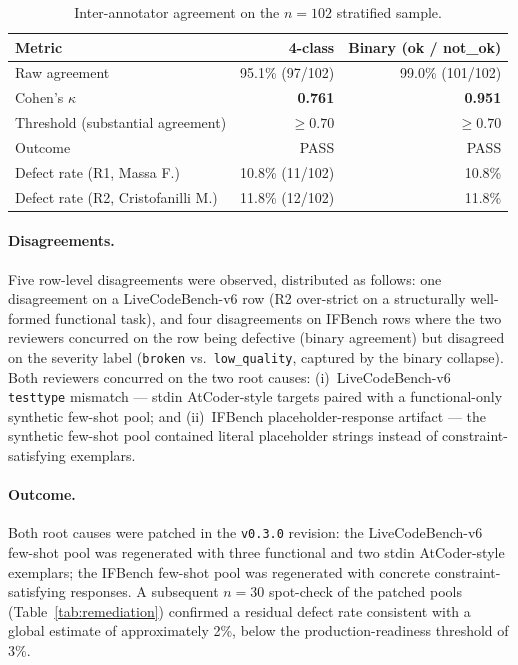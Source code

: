 \documentclass[11pt,a4paper]{article}
\begin{document}
\begin{table}[ht]
\centering
\caption{Inter-annotator agreement on the $n=102$ stratified sample.}
\label{tab:kappa}
\small
\begin{tabular}{l r r}
\toprule
\textbf{Metric} & \textbf{4-class} & \textbf{Binary (ok / not\_ok)} \\
\midrule
Raw agreement      & 95.1\% (97/102) & 99.0\% (101/102) \\
Cohen's $\kappa$~\cite{cohen1960kappa}   & \textbf{0.761}  & \textbf{0.951} \\
Threshold (substantial agreement) & $\ge 0.70$ & $\ge 0.70$ \\
Outcome            & PASS            & PASS \\
\midrule
Defect rate (R1, Massa F.)        & 10.8\% (11/102) & 10.8\% \\
Defect rate (R2, Cristofanilli M.)& 11.8\% (12/102) & 11.8\% \\
\bottomrule
\end{tabular}
\end{table}

\paragraph{Disagreements.} Five row-level disagreements were observed, distributed as follows: one disagreement on a LiveCodeBench-v6 row (R2 over-strict on a structurally well-formed functional task), and four disagreements on IFBench rows where the two reviewers concurred on the row being defective (binary agreement) but disagreed on the severity label (\texttt{broken} vs.\ \texttt{low\_quality}, captured by the binary collapse). Both reviewers concurred on the two root causes: (i)~LiveCodeBench-v6 \texttt{testtype} mismatch — stdin AtCoder-style targets paired with a functional-only synthetic few-shot pool; and (ii)~IFBench placeholder-response artifact — the synthetic few-shot pool contained literal placeholder strings instead of constraint-satisfying exemplars.

\paragraph{Outcome.} Both root causes were patched in the \texttt{v0.3.0} revision: the LiveCodeBench-v6 few-shot pool was regenerated with three functional and two stdin AtCoder-style exemplars; the IFBench few-shot pool was regenerated with concrete constraint-satisfying responses. A subsequent $n=30$ spot-check of the patched pools (Table~\ref{tab:remediation}) confirmed a residual defect rate consistent with a global estimate of approximately 2\%, below the production-readiness threshold of 3\%.
\end{document}
